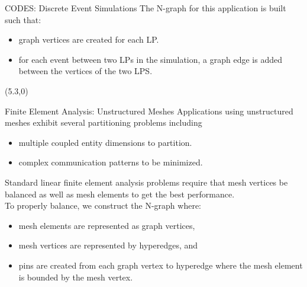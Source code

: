 \documentclass{beamer}
\begin{document}
\begin{textblock}{15.6}
\begin{textblock}{5}
\begin{block}{\centering CODES: Discrete Event Simulations}
      The N-graph for this application is built such that:
      \begin{itemize}
      \item graph vertices are created for each LP.
      \item for each event between two LPs in the simulation, a graph edge is added between the vertices of the two LPS.
      \end{itemize}
    \end{block}
  \end{textblock}
  \begin{textblock}{5}(5.3,0)
    \begin{block}{\centering Finite Element Analysis: Unstructured Meshes}
      Applications using unstructured meshes exhibit several partitioning problems including
      \begin{itemize}
      \item multiple coupled entity dimensions to partition.
      \item complex communication patterns to be minimized.
      \end{itemize}
      Standard linear finite element analysis problems require that mesh vertices be balanced as well as mesh elements to get the best performance.\\
      To properly balance, we construct the N-graph where:
      \begin{itemize}
      \item mesh elements are represented as graph vertices,
      \item mesh vertices are represented by hyperedges, and
      \item pins are created from each graph vertex to hyperedge where the mesh element is bounded by the mesh vertex.

\end{itemize}
\end{block}
\end{textblock}
\end{textblock}
\end{document}
